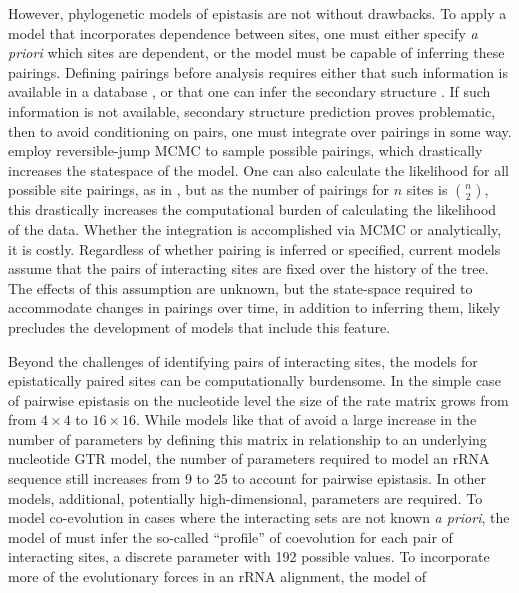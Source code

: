 \documentclass[11pt]{article}
\begin{document}
However, phylogenetic models of epistasis are not without drawbacks.
To apply a model that incorporates dependence between sites, one must either specify \textit{a priori} which sites are dependent, or the model must be capable of inferring these pairings.
Defining pairings before analysis requires either that such information is available in a database \citep[\textit{e.g.},][]{wuyts2004european}, or that one can infer the secondary structure \citep[\textit{e.g.},][]{lorenz2011viennarna}.
If such information is not available, secondary structure prediction proves problematic, then to avoid conditioning on pairs, one must integrate over pairings in some way.
\cite{meyer2019simultaneous} employ reversible-jump MCMC \citep{green1995reversible} to sample possible pairings, which drastically increases the statespace of the model.
One can also calculate the likelihood for all possible site pairings, as in \citet{golden2020evolutionary}, but as the number of pairings for $n$ sites is $n \choose 2$, this drastically increases the computational burden of calculating the likelihood of the data.
Whether the integration is accomplished via MCMC or analytically, it is costly.
Regardless of whether pairing is inferred or specified, current models assume that the pairs of interacting sites are fixed over the history of the tree.
The effects of this assumption are unknown, but the state-space required to accommodate changes in pairings over time, in addition to inferring them, likely precludes the development of models that include this feature.

Beyond the challenges of identifying pairs of interacting sites, the models for epistatically paired sites can be computationally burdensome.
In the simple case of pairwise epistasis on the nucleotide level the size of the rate matrix grows from from $4 \times 4$ to $16 \times 16$.
While models like that of \citet{nasrallah2013phylogenetic} avoid a large increase in the number of parameters by defining this matrix in relationship to an underlying nucleotide GTR model, the number of parameters required to model an rRNA sequence still increases from 9 to 25 to account for pairwise epistasis.
In other models, additional, potentially high-dimensional, parameters are required.
To model co-evolution in cases where the interacting sets are not known \textit{a priori}, the model of \citet{meyer2019simultaneous} must infer the so-called ``profile'' of coevolution for each pair of interacting sites, a discrete parameter with 192 possible values.
To incorporate more of the evolutionary forces in an rRNA alignment, the model of \citet{golden2020evolutionary}
\end{document}
